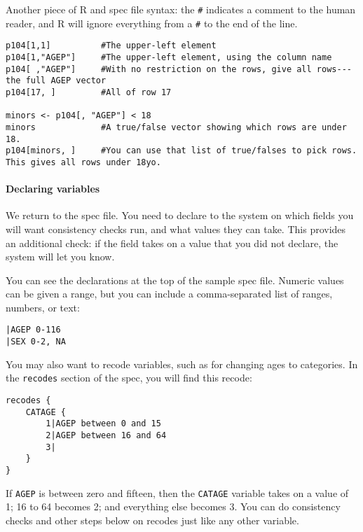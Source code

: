\documentclass{article}
\begin{document}
Another piece of R and spec file syntax: the {\tt \#} indicates a comment to the human
reader, and R will ignore everything from a {\tt \#} to the end of the line.
\begin{rcode} 
\begin{verbatim}
p104[1,1]          #The upper-left element
p104[1,"AGEP"]     #The upper-left element, using the column name
p104[ ,"AGEP"]     #With no restriction on the rows, give all rows---the full AGEP vector
p104[17, ]         #All of row 17

minors <- p104[, "AGEP"] < 18  
minors             #A true/false vector showing which rows are under 18.
p104[minors, ]     #You can use that list of true/falses to pick rows. This gives all rows under 18yo.
\end{verbatim}
\end{rcode} 

\paragraph{Declaring variables} 
We return to the spec file. You need to declare to the system on which fields
you will want consistency checks run, and what values they can take.
This provides an additional check: if the field takes on a value that you did
not declare, the system will let you know.

You can see the declarations at the top of the sample spec file. Numeric values
can be given a range, but you can include a comma-separated list of ranges,
numbers, or text:
\begin{specbit} 
\begin{verbatim}
|AGEP 0-116
|SEX 0-2, NA
\end{verbatim}
\end{specbit} 

You may also want to recode variables, such as for changing ages to categories. 
In the {\tt recodes} section of the spec, you will find this recode:
\begin{specbit} 
\begin{verbatim}
recodes {
	CATAGE {
		1|AGEP between 0 and 15
		2|AGEP between 16 and 64
		3|
	}
}
\end{verbatim}
\end{specbit} 
If {\tt AGEP} is between zero and fifteen, then the {\tt CATAGE} variable takes
on a value of 1; 16 to 64 becomes 2; and everything else becomes 3. 
You can do consistency checks and other steps below 
on recodes just like any other variable.
\end{document}
